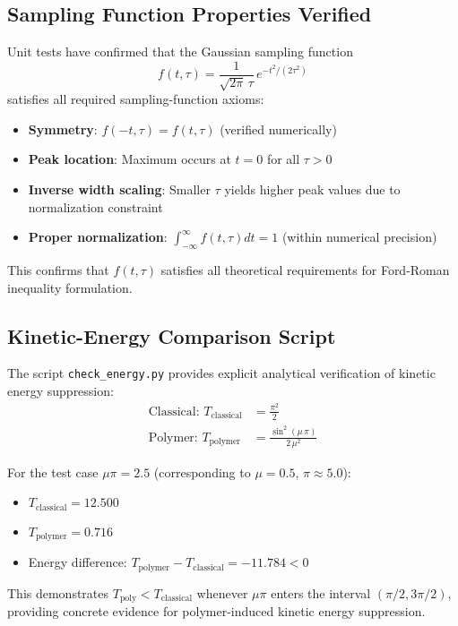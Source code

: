 \documentclass[12pt]{article}
\begin{document}
\subsection{Sampling Function Properties Verified}

Unit tests have confirmed that the Gaussian sampling function
\begin{equation}
f(t,\tau) = \frac{1}{\sqrt{2\pi}\,\tau}\,e^{-t^2/(2\tau^2)}
\end{equation}
satisfies all required sampling-function axioms:
\begin{itemize}
\item \textbf{Symmetry}: $f(-t,\tau) = f(t,\tau)$ (verified numerically)
\item \textbf{Peak location}: Maximum occurs at $t = 0$ for all $\tau > 0$
\item \textbf{Inverse width scaling}: Smaller $\tau$ yields higher peak values due to normalization constraint
\item \textbf{Proper normalization}: $\int_{-\infty}^{\infty} f(t,\tau) dt = 1$ (within numerical precision)
\end{itemize}

This confirms that $f(t,\tau)$ satisfies all theoretical requirements for Ford-Roman inequality formulation.

\subsection{Kinetic-Energy Comparison Script}

The script \texttt{check\_energy.py} provides explicit analytical verification of kinetic energy suppression:
\begin{align}
\text{Classical: } T_{\text{classical}} &= \frac{\pi^2}{2} \\
\text{Polymer: } T_{\text{polymer}} &= \frac{\sin^2(\mu\,\pi)}{2\,\mu^2}
\end{align}

For the test case $\mu\pi = 2.5$ (corresponding to $\mu = 0.5$, $\pi \approx 5.0$):
\begin{itemize}
\item $T_{\text{classical}} = 12.500$
\item $T_{\text{polymer}} = 0.716$  
\item Energy difference: $T_{\text{polymer}} - T_{\text{classical}} = -11.784 < 0$
\end{itemize}

This demonstrates $T_{\text{poly}} < T_{\text{classical}}$ whenever $\mu\pi$ enters the interval $(\pi/2, 3\pi/2)$, providing concrete evidence for polymer-induced kinetic energy suppression.
\end{document}

